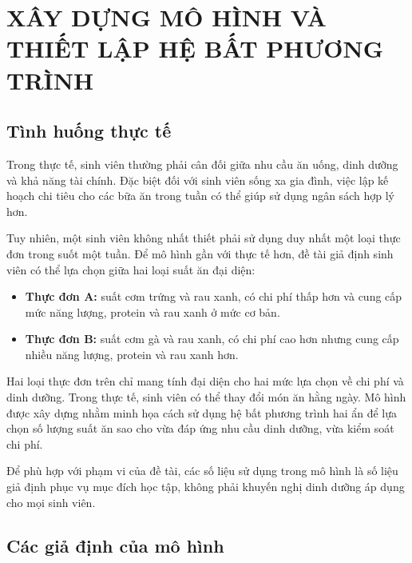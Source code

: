 \documentclass[12pt,a4paper]{article}
\begin{document}
\newpage

\section{XÂY DỰNG MÔ HÌNH VÀ THIẾT LẬP HỆ BẤT PHƯƠNG TRÌNH}

\subsection{Tình huống thực tế}

Trong thực tế, sinh viên thường phải cân đối giữa nhu cầu ăn uống, dinh dưỡng và khả năng tài chính. Đặc biệt đối với sinh viên sống xa gia đình, việc lập kế hoạch chi tiêu cho các bữa ăn trong tuần có thể giúp sử dụng ngân sách hợp lý hơn.

Tuy nhiên, một sinh viên không nhất thiết phải sử dụng duy nhất một loại thực đơn trong suốt một tuần. Để mô hình gần với thực tế hơn, đề tài giả định sinh viên có thể lựa chọn giữa hai loại suất ăn đại diện:
\begin{itemize}
    \item \textbf{Thực đơn A:} suất cơm trứng và rau xanh, có chi phí thấp hơn và cung cấp mức năng lượng, protein và rau xanh ở mức cơ bản.
    \item \textbf{Thực đơn B:} suất cơm gà và rau xanh, có chi phí cao hơn nhưng cung cấp nhiều năng lượng, protein và rau xanh hơn.
\end{itemize}

Hai loại thực đơn trên chỉ mang tính đại diện cho hai mức lựa chọn về chi phí và dinh dưỡng. Trong thực tế, sinh viên có thể thay đổi món ăn hằng ngày. Mô hình được xây dựng nhằm minh họa cách sử dụng hệ bất phương trình hai ẩn để lựa chọn số lượng suất ăn sao cho vừa đáp ứng nhu cầu dinh dưỡng, vừa kiểm soát chi phí.

Để phù hợp với phạm vi của đề tài, các số liệu sử dụng trong mô hình là số liệu giả định phục vụ mục đích học tập, không phải khuyến nghị dinh dưỡng áp dụng cho mọi sinh viên.

\subsection{Các giả định của mô hình}
\end{document}
